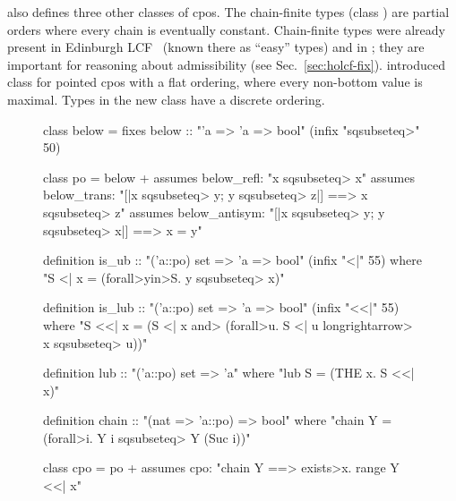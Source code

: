  also defines three other classes of cpos. The chain-finite types (class ) are partial orders where every chain is eventually constant. Chain-finite types were already present in Edinburgh LCF~\cite{GMW79} (known there as ``easy'' types) and in ; they are important for reasoning about admissibility (see Sec.~\ref{sec:holcf-fix}).  introduced class  for pointed cpos with a flat ordering, where every non-bottom value is maximal. Types in the new  class  have a discrete ordering.

\begin{figure}
\begin{isacode}
class below =
  fixes below :: "'a => 'a => bool" (infix "\<sqsubseteq>" 50)
\end{isacode}
\unmedskip
{}
\begin{isacode}
class po = below +
  assumes below_refl: "x \<sqsubseteq> x"
  assumes below_trans: "[|x \<sqsubseteq> y; y \<sqsubseteq> z|] ==> x \<sqsubseteq> z"
  assumes below_antisym: "[|x \<sqsubseteq> y; y \<sqsubseteq> x|] ==> x = y"
\end{isacode}
\unmedskip
{}
\begin{isacode}
definition is_ub :: "('a::po) set => 'a => bool" (infix "<|" 55)
  where "S <| x = (\<forall>y\<in>S. y \<sqsubseteq> x)"
\end{isacode}
\unmedskip
{}
\begin{isacode}
definition is_lub :: "('a::po) set => 'a => bool" (infix "<<|" 55)
  where "S <<| x = (S <| x \<and> (\<forall>u. S <| u \<longrightarrow> x \<sqsubseteq> u))"
\end{isacode}
\unmedskip
{}
\begin{isacode}
definition lub :: "('a::po) set => 'a"
  where "lub S = (THE x. S <<| x)"
\end{isacode}
\unmedskip
{}
\begin{isacode}
definition chain :: "(nat => 'a::po) => bool"
  where "chain Y = (\<forall>i. Y i \<sqsubseteq> Y (Suc i))"
\end{isacode}
\unmedskip
{}
\begin{isacode}
class cpo = po +
  assumes cpo: "chain Y ==> \<exists>x. range Y <<| x"

\end{isacode}
\end{figure}
